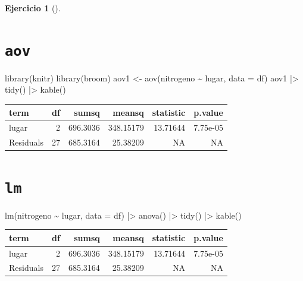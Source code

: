 \documentclass[
  a4paper,
]{scrreport}
\newenvironment{Shaded}{\begin{snugshade}}{\end{snugshade}}
\newcommand{\AttributeTok}[1]{\textcolor[rgb]{0.40,0.45,0.13}{#1}}
\newcommand{\FunctionTok}[1]{\textcolor[rgb]{0.28,0.35,0.67}{#1}}
\newcommand{\NormalTok}[1]{\textcolor[rgb]{0.00,0.23,0.31}{#1}}
\newcommand{\OtherTok}[1]{\textcolor[rgb]{0.00,0.23,0.31}{#1}}
\newcommand{\SpecialCharTok}[1]{\textcolor[rgb]{0.37,0.37,0.37}{#1}}
\theoremstyle{definition}
\newtheorem{exercise}{Ejercicio}[chapter]
\theoremstyle{remark}
\begin{document}
\begin{exercise}[]
\begin{enumerate}
\begin{tcolorbox}
  \section{\texorpdfstring{\texttt{aov}}{aov}}

\begin{Shaded}
\begin{Highlighting}[]
\FunctionTok{library}\NormalTok{(knitr)}
\FunctionTok{library}\NormalTok{(broom)}
\NormalTok{aov1 }\OtherTok{\textless{}{-}} \FunctionTok{aov}\NormalTok{(nitrogeno }\SpecialCharTok{\textasciitilde{}}\NormalTok{ lugar, }\AttributeTok{data =}\NormalTok{ df) }
\NormalTok{aov1 }\SpecialCharTok{|\textgreater{}} 
    \FunctionTok{tidy}\NormalTok{() }\SpecialCharTok{|\textgreater{}} 
    \FunctionTok{kable}\NormalTok{()}
\end{Highlighting}
\end{Shaded}

  \begin{longtable}[]{@{}lrrrrr@{}}
  \toprule\noalign{}
  term & df & sumsq & meansq & statistic & p.value \\
  \midrule\noalign{}
  \endhead
  \bottomrule\noalign{}
  \endlastfoot
  lugar & 2 & 696.3036 & 348.15179 & 13.71644 & 7.75e-05 \\
  Residuals & 27 & 685.3164 & 25.38209 & NA & NA \\
  \end{longtable}

  \section{\texorpdfstring{\texttt{lm}}{lm}}

\begin{Shaded}
\begin{Highlighting}[]
\FunctionTok{lm}\NormalTok{(nitrogeno }\SpecialCharTok{\textasciitilde{}}\NormalTok{ lugar, }\AttributeTok{data =}\NormalTok{ df) }\SpecialCharTok{|\textgreater{}} 
    \FunctionTok{anova}\NormalTok{() }\SpecialCharTok{|\textgreater{}} 
    \FunctionTok{tidy}\NormalTok{() }\SpecialCharTok{|\textgreater{}} 
    \FunctionTok{kable}\NormalTok{()}
\end{Highlighting}
\end{Shaded}

  \begin{longtable}[]{@{}lrrrrr@{}}
  \toprule\noalign{}
  term & df & sumsq & meansq & statistic & p.value \\
  \midrule\noalign{}
  \endhead
  \bottomrule\noalign{}
  \endlastfoot
  lugar & 2 & 696.3036 & 348.15179 & 13.71644 & 7.75e-05 \\
  Residuals & 27 & 685.3164 & 25.38209 & NA & NA \\
  \end{longtable}


\end{tcolorbox}
\end{enumerate}
\end{exercise}
\end{document}
